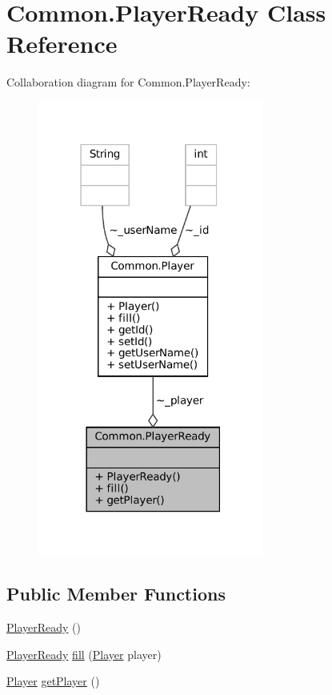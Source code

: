 \hypertarget{classCommon_1_1PlayerReady}{}\section{Common.\+Player\+Ready Class Reference}
\label{classCommon_1_1PlayerReady}


Collaboration diagram for Common.\+Player\+Ready\+:
\nopagebreak
\begin{figure}[H]
\begin{center}
\leavevmode
\includegraphics[width=210pt]{classCommon_1_1PlayerReady__coll__graph}
\end{center}
\end{figure}
\subsection*{Public Member Functions}
\begin{DoxyCompactItemize}
\item 
\mbox{\hyperlink{classCommon_1_1PlayerReady_a1ff6236d6f61b61f89955f2f2d618118}{Player\+Ready}} ()
\item 
\mbox{\hyperlink{classCommon_1_1PlayerReady}{Player\+Ready}} \mbox{\hyperlink{classCommon_1_1PlayerReady_af47dc94fb6f6eef26e062fb211ec173a}{fill}} (\mbox{\hyperlink{classCommon_1_1Player}{Player}} player)
\item 
\mbox{\hyperlink{classCommon_1_1Player}{Player}} \mbox{\hyperlink{classCommon_1_1PlayerReady_aa64f37b079e34f6e9a74416f68d334a5}{get\+Player}} ()
\end{DoxyCompactItemize}


